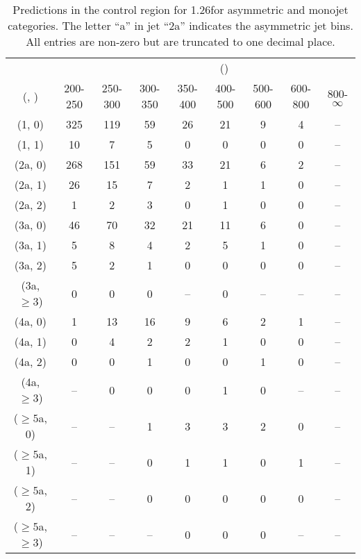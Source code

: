 \begin{table}[h!]
\tiny
\centering
\caption{Predictions in the \mmj control region for 1.26\ifb for asymmetric and monojet categories. The letter ``a'' in jet \eg ``2a''  indicates the asymmetric jet bins. All entries are non-zero but are truncated to one decimal place.\label{tab:predsep_mumu_data_asym}}
\begin{tabular}
{ccccccccc}
	\hline\hline
&	& \multicolumn{8}{c}{\scalht (\gev)} \\ 
	 (\njet,  \nb) & 200-250 & 250-300 & 300-350 & 350-400 & 400-500 & 500-600 & 600-800 & 800-$\infty$ \\ [0.8ex] 
\hline
	(1, 0) & 325 & 119 & 59 & 26 & 21 & 9 & 4 & -- \\[0.5ex] 
	(1, 1) & 10 & 7 & 5 & 0 & 0 & 0 & 0 & -- \\[0.5ex] 
	(2a, 0) & 268 & 151 & 59 & 33 & 21 & 6 & 2 & -- \\[0.5ex] 
	(2a, 1) & 26 & 15 & 7 & 2 & 1 & 1 & 0 & -- \\[0.5ex] 
	(2a, 2) & 1 & 2 & 3 & 0 & 1 & 0 & 0 & -- \\[0.5ex] 
	(3a, 0) & 46 & 70 & 32 & 21 & 11 & 6 & 0 & -- \\[0.5ex] 
	(3a, 1) & 5 & 8 & 4 & 2 & 5 & 1 & 0 & -- \\[0.5ex] 
	(3a, 2) & 5 & 2 & 1 & 0 & 0 & 0 & 0 & -- \\[0.5ex] 
	(3a, $\ge3$) & 0 & 0 & 0 & -- & 0 & -- & -- & -- \\[0.5ex] 
	(4a, 0) & 1 & 13 & 16 & 9 & 6 & 2 & 1 & -- \\[0.5ex] 
	(4a, 1) & 0 & 4 & 2 & 2 & 1 & 0 & 0 & -- \\[0.5ex] 
	(4a, 2) & 0 & 0 & 1 & 0 & 0 & 1 & 0 & -- \\[0.5ex] 
	(4a, $\ge3$) & -- & 0 & 0 & 0 & 1 & 0 & -- & -- \\[0.5ex] 
	($\ge5$a, 0) & -- & -- & 1 & 3 & 3 & 2 & 0 & -- \\[0.5ex] 
	($\ge5$a, 1) & -- & -- & 0 & 1 & 1 & 0 & 1 & -- \\[0.5ex] 
	($\ge5$a, 2) & -- & -- & 0 & 0 & 0 & 0 & 0 & -- \\[0.5ex] 
	($\ge5$a, $\ge3$) & -- & -- & -- & 0 & 0 & 0 & -- & -- \\[0.5ex] 
	\hline
	\hline
\end{tabular}
\end{table}
